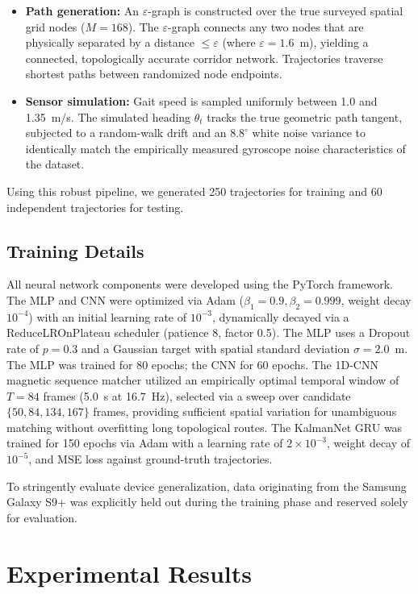 \documentclass[conference]{IEEEtran}
\begin{document}
\begin{itemize}
    \item \textbf{Path generation:} An $\varepsilon$-graph is constructed over the true surveyed spatial grid nodes ($M=168$). The $\varepsilon$-graph connects any two nodes that are physically separated by a distance $\leq \varepsilon$ (where $\varepsilon = 1.6$~m), yielding a connected, topologically accurate corridor network. Trajectories traverse shortest paths between randomized node endpoints.
    \item \textbf{Sensor simulation:} Gait speed is sampled uniformly between 1.0 and 1.35~m/s. The simulated heading $\theta_t$ tracks the true geometric path tangent, subjected to a random-walk drift and an $8.8^{\circ}$ white noise variance to identically match the empirically measured gyroscope noise characteristics of the dataset.
\end{itemize}
Using this robust pipeline, we generated 250 trajectories for training and 60 independent trajectories for testing.

\subsection{Training Details}

All neural network components were developed using the PyTorch framework. The MLP and CNN were optimized via Adam ($\beta_1 = 0.9, \beta_2 = 0.999$, weight decay $10^{-4}$) with an initial learning rate of $10^{-3}$, dynamically decayed via a ReduceLROnPlateau scheduler (patience 8, factor 0.5). The MLP uses a Dropout rate of $p = 0.3$ and a Gaussian target with spatial standard deviation $\sigma = 2.0$~m. The MLP was trained for 80 epochs; the CNN for 60 epochs. The 1D-CNN magnetic sequence matcher utilized an empirically optimal temporal window of $T = 84$ frames (5.0~s at 16.7~Hz), selected via a sweep over candidate $\{50, 84, 134, 167\}$ frames, providing sufficient spatial variation for unambiguous matching without overfitting long topological routes. The KalmanNet GRU was trained for 150 epochs via Adam with a learning rate of $2 \times 10^{-3}$, weight decay of $10^{-5}$, and MSE loss against ground-truth trajectories.

To stringently evaluate device generalization, data originating from the Samsung Galaxy S9+ was explicitly held out during the training phase and reserved solely for evaluation.

\section{Experimental Results}\label{sec:results}
\end{document}
